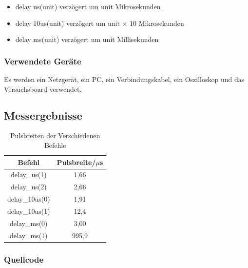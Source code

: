 \documentclass[12pt,a4paper]{article}
\begin{document}
\begin{itemize}
\item	delay us(unit) verzögert um unit Mikrosekunden

\item	delay 10us(unit) verzögert um unit $\times$ 10 Mikrosekunden

\item	delay ms(unit) verzögert um unit Millisekunden
\end{itemize}

\subsubsection*{Verwendete Geräte}

Es werden ein Netzgerät, ein PC, ein Verbindungskabel, ein Oszilloskop und das Versuchsboard verwendet.


\subsection*{Messergebnisse}
\begin{table}[H]
\centering
\begin{tabular}{|c|c|}
	\hline
	    Befehl     & Pulsbreite/$\mu$s \\ \hline\hline
	 delay\_us(1)  &       1,66        \\ \hline
	 delay\_us(2)  &       2,66        \\ \hline
	delay\_10us(0) &       1,91        \\ \hline
	delay\_10us(1) &       12,4        \\ \hline
	 delay\_ms(0)  &       3,00        \\ \hline
	 delay\_ms(1)  &       995,9       \\ \hline
\end{tabular} 
\caption{Pulsbreiten der Verschiedenen Befehle}
\label{tab:puls_1}
\end{table}


\subsubsection*{Quellcode}
\end{document}
